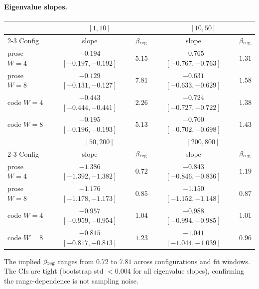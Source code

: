\documentclass[12pt]{article}
\theoremstyle{remark}
\begin{document}
\paragraph{Eigenvalue slopes.}
\begin{center}
\small
\begin{tabular}{lcccc}
\toprule
& \multicolumn{2}{c}{$[1,10]$} & \multicolumn{2}{c}{$[10,50]$} \\
\cline{2-3} \cline{4-5}
Config & slope & $\beta_{\rm reg}$ & slope & $\beta_{\rm reg}$ \\
\midrule
prose $W\!=\!4$ & $-0.194$ $[-0.197,-0.192]$ & $5.15$ & $-0.765$ $[-0.767,-0.763]$ & $1.31$ \\
prose $W\!=\!8$ & $-0.129$ $[-0.131,-0.127]$ & $7.81$ & $-0.631$ $[-0.633,-0.629]$ & $1.58$ \\
code $W\!=\!4$ & $-0.443$ $[-0.444,-0.441]$ & $2.26$ & $-0.724$ $[-0.727,-0.722]$ & $1.38$ \\
code $W\!=\!8$ & $-0.195$ $[-0.196,-0.193]$ & $5.13$ & $-0.700$ $[-0.702,-0.698]$ & $1.43$ \\
\midrule
& \multicolumn{2}{c}{$[50,200]$} & \multicolumn{2}{c}{$[200,800]$} \\
\cline{2-3} \cline{4-5}
Config & slope & $\beta_{\rm reg}$ & slope & $\beta_{\rm reg}$ \\
\midrule
prose $W\!=\!4$ & $-1.386$ $[-1.392,-1.382]$ & $0.72$ & $-0.843$ $[-0.846,-0.836]$ & $1.19$ \\
prose $W\!=\!8$ & $-1.176$ $[-1.178,-1.173]$ & $0.85$ & $-1.150$ $[-1.152,-1.148]$ & $0.87$ \\
code $W\!=\!4$ & $-0.957$ $[-0.959,-0.954]$ & $1.04$ & $-0.988$ $[-0.994,-0.985]$ & $1.01$ \\
code $W\!=\!8$ & $-0.815$ $[-0.817,-0.813]$ & $1.23$ & $-1.041$ $[-1.044,-1.039]$ & $0.96$ \\
\bottomrule
\end{tabular}
\end{center}
The implied $\beta_{\rm reg}$ ranges from $0.72$ to $7.81$ across
configurations and fit windows. The CIs are tight (bootstrap std $<0.004$ for
all eigenvalue slopes), confirming the range-dependence is not sampling noise.
\end{document}
